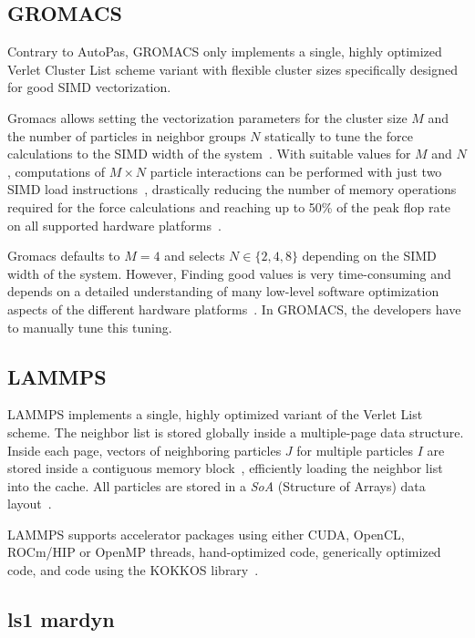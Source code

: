\documentclass[conference]{IEEEtran}
\begin{document}
\subsection{GROMACS}

Contrary to AutoPas, GROMACS only implements a single, highly optimized Verlet Cluster List scheme variant with flexible cluster sizes specifically designed for good SIMD vectorization.

Gromacs allows setting the vectorization parameters for the cluster size $M$ and the number of particles in neighbor groups $N$ statically to tune the force calculations to the SIMD width of the system~\cite{PALL20132641}. With suitable values for $M$ and $N$, computations of $M \times N$ particle interactions can be performed with just two SIMD load instructions~\cite{Solving_Software_Challenges_Exascale_2014}, drastically reducing the number of memory operations required for the force calculations and reaching up to 50\% of the peak flop rate on all supported hardware platforms~\cite{Solving_Software_Challenges_Exascale_2014}.

Gromacs defaults to $M=4$ and selects $N \in \{2, 4, 8\}$ depending on the SIMD width of the system. However, Finding good values is very time-consuming and depends on a detailed understanding of many low-level software optimization aspects of the different hardware platforms~\cite{PALL20132641}. In GROMACS, the developers have to manually tune this tuning.

\subsection{LAMMPS}

LAMMPS implements a single, highly optimized variant of the Verlet List scheme. The neighbor list is stored globally inside a multiple-page data structure. Inside each page, vectors of neighboring particles $J$ for multiple particles $I$ are stored inside a contiguous memory block~\cite{THOMPSON2022108171}, efficiently loading the neighbor list into the cache.
All particles are stored in a \textit{SoA} (Structure of Arrays) data layout~\cite{THOMPSON2022108171}.

LAMMPS supports accelerator packages using either CUDA, OpenCL, ROCm/HIP or OpenMP threads, hand-optimized
code, generically optimized code, and code using the KOKKOS library~\cite{Seckler2021}.


\subsection{ls1 mardyn}
\end{document}
